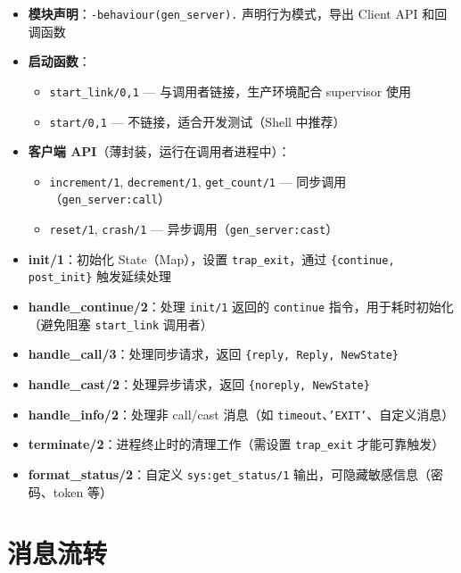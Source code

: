 \documentclass[a4paper,11pt]{article}
\begin{document}
\begin{itemize}[leftmargin=2em]
    \item \textbf{模块声明}：\texttt{-behaviour(gen\_server).} 声明行为模式，导出 Client API 和回调函数
    \item \textbf{启动函数}：
    \begin{itemize}[leftmargin=1.5em]
        \item \texttt{start\_link/0,1} --- 与调用者链接，生产环境配合 supervisor 使用
        \item \texttt{start/0,1} --- 不链接，适合开发测试（Shell 中推荐）
    \end{itemize}
    \item \textbf{客户端 API}（薄封装，运行在调用者进程中）：
    \begin{itemize}[leftmargin=1.5em]
        \item \texttt{increment/1}, \texttt{decrement/1}, \texttt{get\_count/1} --- 同步调用（\texttt{gen\_server:call}）
        \item \texttt{reset/1}, \texttt{crash/1} --- 异步调用（\texttt{gen\_server:cast}）
    \end{itemize}
    \item \textbf{init/1}：初始化 State（Map），设置 \texttt{trap\_exit}，通过 \texttt{\{continue, post\_init\}} 触发延续处理
    \item \textbf{handle\_continue/2}：处理 \texttt{init/1} 返回的 \texttt{continue} 指令，用于耗时初始化（避免阻塞 \texttt{start\_link} 调用者）
    \item \textbf{handle\_call/3}：处理同步请求，返回 \texttt{\{reply, Reply, NewState\}}
    \item \textbf{handle\_cast/2}：处理异步请求，返回 \texttt{\{noreply, NewState\}}
    \item \textbf{handle\_info/2}：处理非 call/cast 消息（如 \texttt{timeout}、\texttt{'EXIT'}、自定义消息）
    \item \textbf{terminate/2}：进程终止时的清理工作（需设置 \texttt{trap\_exit} 才能可靠触发）
    \item \textbf{format\_status/2}：自定义 \texttt{sys:get\_status/1} 输出，可隐藏敏感信息（密码、token 等）
\end{itemize}


\section{消息流转}
\end{document}
